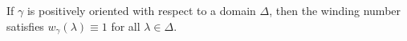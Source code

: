 If $\gamma$ is positively oriented with respect to a domain $\Delta$, then the winding number satisfies $w_{\gamma}(\lambda) \equiv 1$ for all $\lambda \in \Delta$.
